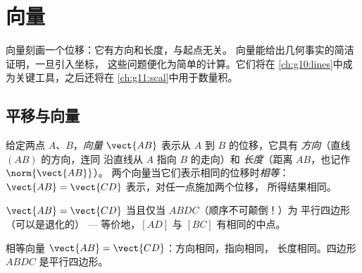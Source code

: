 \chapter{向量}\label{ch:g10:vectors}

向量刻画一个位移：它有方向和长度，与起点无关。
向量能给出几何事实的简洁证明，一旦引入坐标，
这些问题便化为简单的计算。它们将在
\cref{ch:g10:lines}中成为关键工具，之后还将在
\cref{ch:g11:scal}中用于数量积。

\section{平移与向量}

\begin{definition}[向量]\label{def:g10:vectors:vector}
给定两点 $A$、$B$，\emph{向量} $\vect{AB}$
表示从 $A$ 到 $B$ 的位移，它具有
\emph{方向}（直线 $(AB)$ 的方向，连同
沿直线从 $A$ 指向 $B$ 的走向）和
\emph{长度}（距离 $AB$，也记作 $\norm{\vect{AB}}$）。
两个向量当它们表示相同的位移时\emph{相等}：
$\vect{AB} = \vect{CD}$ 表示，对任一点施加两个位移，
所得结果相同。
\end{definition}

\begin{proposition}[相等向量与平行四边形]\label{prop:g10:vectors:parallelogram}
$\vect{AB} = \vect{CD}$ 当且仅当 $ABDC$（顺序不可颠倒！）为
平行四边形（可以是退化的） --- 等价地，$[AD]$ 与
$[BC]$ 有相同的中点。
\end{proposition}
\admitted

\begin{omfigure}

{\small 相等向量 $\vect{AB} = \vect{CD}$：方向相同，指向相同，
长度相同。四边形 $ABDC$ 是平行四边形。}
\end{omfigure}

